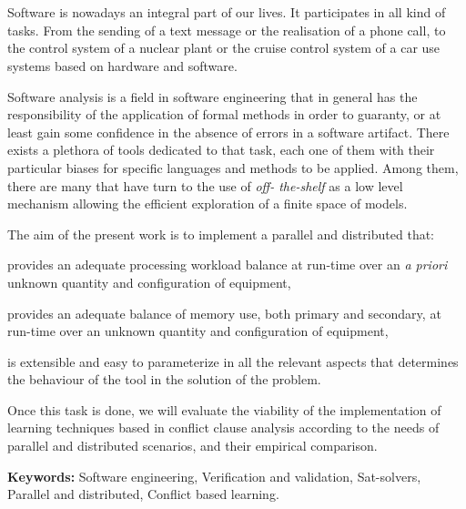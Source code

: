 
\chapter*{\runtitle}

Software is nowadays an integral part of our lives. It participates in all
kind of tasks. From the sending of a text message or the realisation of a
phone call, to the control system of a nuclear plant or the cruise control
system of a car use systems based on hardware and software.

Software analysis is a field in software engineering that in general has the
responsibility of the application of formal methods in order to guaranty, or
at least gain some confidence in the absence of errors in a software artifact.
There exists a plethora of tools dedicated to that task, each one of them with
their particular biases for specific languages and methods to be applied.
Among them, there are many that have turn to the use of \ssolvers \emph{off-
the-shelf}  as a low level mechanism allowing the efficient exploration of a
finite space of models.
 
The aim of the present work is to implement a parallel and distributed
\ssolver that: \begin{inparaenum}[a)]   \item provides an adequate processing
workload balance at run-time over an \emph{a priori} unknown quantity and
configuration of equipment, \item provides an adequate balance of memory use,
both primary and secondary, at run-time over an unknown quantity and
configuration of equipment, \item is extensible and easy to parameterize in
all the relevant aspects that determines the behaviour of the tool in the
solution of the problem. \end{inparaenum} Once this task is done, we will
evaluate the viability of the implementation of learning techniques based in
conflict clause analysis according to the needs of parallel and distributed
scenarios, and their empirical comparison.

\bigskip

\noindent \textbf{Keywords:} Software engineering, Verification and
validation, Sat-solvers, Parallel and distributed, Conflict based learning.
